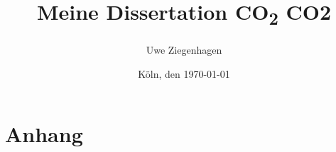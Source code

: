\documentclass[ngerman, 12pt,oneside,parskip=half,liststotoc,bibtotoc]{scrbook}
\author{Uwe Ziegenhagen}
\title{Meine Dissertation CO\textsubscript{2} CO2}
\date{Köln, den \today}
\begin{document}
\maketitle

\frontmatter
\tableofcontents

\listoffigures

\listoftables

\mainmatter








\backmatter
\chapter{Anhang}

\printbibliography
\end{document}
